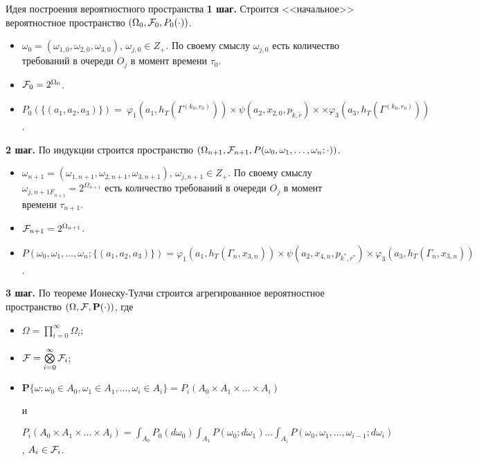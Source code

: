 \documentclass[10pt]{beamer}
\begin{document}
\begin{frame}[allowframebreaks]{Идея построения вероятностного пространства}
\textbf{1 шаг.} Строится <<начальное>> вероятностное пространство $(\Omega_0, {\cal F}_0, P_0(\cdot))$. 
\begin{itemize} 
\item $\omega_0 = (\omega_{1,0}, \omega_{2,0},\omega_{3,0})$, $\omega_{j,0} \in Z_+$. По своему смыслу $\omega_{j,0}$ есть количество требований в очереди $O_j$ в момент времени $\tau_0$.
\item ${\cal F}_0=2^{\Omega_0}$.
\item $P_0(\{(a_1,a_2,a_3)\})=~\varphi_1(a_1,h_T(\Gamma^{(k_0,r_0)})) \times \psi(a_2,x_{2,0}, p_{\tilde{k},\tilde{r}}) \times \times \varphi_3(a_3,h_T(\Gamma^{(k_0,r_0)}))$.
\end{itemize}

\framebreak
\textbf{2 шаг.} По индукции строится пространство $(\Omega_{n+1}, {\cal F}_{n+1}, P(\omega_0,\omega_1,\ldots, \omega_{n};\cdot))$.
\begin{itemize} 
\item $\omega_{n+1} = (\omega_{1,n+1}, \omega_{2,n+1},\omega_{3,n+1})$, $\omega_{j,n+1} \in Z_+$.  По своему смыслу $\omega_{j,n+1 F}_{n+1}=2^{\Omega_{n+1}}$  есть количество требований в очереди $O_j$ в момент времени $\tau_{n+1}$.
\item ${\cal F}_{n+1}=2^{\Omega_{n+1}}$.
\item $P(\omega_0,\omega_1,\ldots,\omega_n;\{(a_1,a_2,a_3)\}) =  \varphi_1(a_1,h_T(\Gamma_n,x_{3,n})) \times \psi(a_2,x_{4,n}, p_{k^*,r^*}) \times \varphi_3(a_3,h_T(\Gamma_n,x_{3,n}))$.
\end{itemize}

\framebreak
\textbf{3 шаг.} По теореме Ионеску-Тулчи строится агрегированное вероятностное пространство $(\Omega, {\cal F}, {\mathbf P}(\cdot))$, где 
\begin{itemize}
\item $\Omega=\prod\limits_{i=0}^{\infty}\Omega_i$;
\item ${\cal F}=\bigotimes\limits_{i=0}^{\infty} {\cal F}_i$;
\item $ {\mathbf P}\{\omega \colon \omega_0 \in A_0, \omega_1 \in A_1, \ldots, \omega_i\in A_i\} = P_i(A_0 \times A_1 \times \ldots \times A_i)$

и

$ P_i(A_0 \times A_1 \times \ldots \times A_i) = \int_{A_0} P_0(d \omega_0) \int_{A_1} P(\omega_0;d \omega_1) \ldots \int_{A_i} P(\omega_0, \omega_1, \ldots, \omega_{i-1}; d \omega_i)$, $A_i \in {\cal F}_i$.
\end{itemize}



\end{frame}
\end{document}
